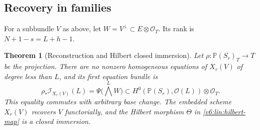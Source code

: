 \documentclass[10pt,fleqn]{article}
\numberwithin{equation}{section}
\newtheorem{theorem}{Theorem}[section]
\newcommand{\PP}{\mathbb P}
\begin{document}
\subsection{Recovery in families}

For a subbundle $V$ as above, let
$W=V^\perp\subset E\otimes\mathcal O_T$.  Its rank is
$N+1-s=L+h-1$.

\begin{theorem}[Reconstruction and Hilbert closed immersion]
\label{v6:lin:reconstruction}
Let $\rho:\PP(S_r)_T\to T$ be the projection.  There are no
nonzero homogeneous equations of $X_r(V)$ of degree less than $L$,
and its first equation bundle is
\begin{equation}\label{v6:lin:first-equations}
 \rho_*\mathcal I_{X_r(V)}(L)
   =\Psi\bigl(\bigwedge^L W\bigr)
   \subset H^0(\PP(S_r),\mathcal O(L))\otimes\mathcal O_T.
\end{equation}
This equality commutes with arbitrary base change.  The embedded
scheme $X_r(V)$ recovers $V$ functorially, and the Hilbert morphism
$\Theta$ in \eqref{v6:lin:hilbert-map} is a closed immersion.
\end{theorem}
\end{document}
